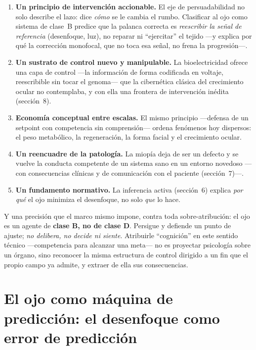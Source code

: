 \documentclass[11pt,a4paper]{article}
\begin{document}
\begin{enumerate}[leftmargin=1.6em]
  \item \textbf{Un principio de intervención accionable.} El eje de persuadabilidad no solo describe el lazo: dice \emph{cómo} se le cambia el rumbo. Clasificar al ojo como sistema de clase~B predice que la palanca correcta es \emph{reescribir la señal de referencia} (desenfoque, luz), no reparar ni \enquote{ejercitar} el tejido ---y explica por qué la corrección monofocal, que no toca esa señal, no frena la progresión---.
  \item \textbf{Un sustrato de control nuevo y manipulable.} La bioelectricidad ofrece una capa de control ---la información de forma codificada en voltaje, reescribible sin tocar el genoma--- que la cibernética clásica del crecimiento ocular no contemplaba, y con ella una frontera de intervención inédita (sección~8).
  \item \textbf{Economía conceptual entre escalas.} El mismo principio ---defensa de un setpoint con competencia sin comprensión--- ordena fenómenos hoy dispersos: el peso metabólico, la regeneración, la forma facial y el crecimiento ocular.
  \item \textbf{Un reencuadre de la patología.} La miopía deja de ser un defecto y se vuelve la conducta competente de un sistema sano en un entorno novedoso ---con consecuencias clínicas y de comunicación con el paciente (sección~7)---.
  \item \textbf{Un fundamento normativo.} La inferencia activa (sección~6) explica \emph{por qué} el ojo minimiza el desenfoque, no solo \emph{que} lo hace.
\end{enumerate}

Y una precisión que el marco mismo impone, contra toda sobre-atribución: el ojo es un agente de \textbf{clase B, no de clase D}. Persigue y defiende un punto de ajuste; \emph{no delibera, no decide ni siente}. Atribuirle \enquote{cognición} en este sentido técnico ---competencia para alcanzar una meta--- no es proyectar psicología sobre un órgano, sino reconocer la misma estructura de control dirigido a un fin que el propio campo ya admite, y extraer de ella sus consecuencias.

\section{El ojo como máquina de predicción: el desenfoque como error de predicción}
\end{document}
